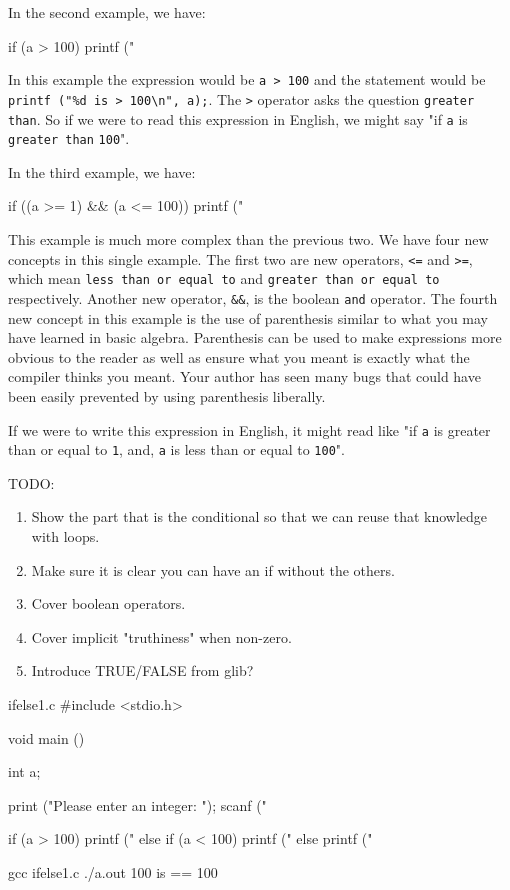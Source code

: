 In the second example, we have:

\begin{code}{}
if (a > 100) {
    printf ("%
}
\end{code}

In this example the expression would be \verb|a > 100| and the statement
would be \verb|printf ("%d is > 100\n", a);|. The \verb|>| operator asks
the question \verb|greater than|. So if we were to read this expression in
English, we might say "if \verb|a| is \verb|greater than| \verb|100|".

In the third example, we have:

\begin{code}{}
if ((a >= 1) && (a <= 100)) {
    printf ("%
}
\end{code}

This example is much more complex than the previous two.  We have four new
concepts in this single example. The first two are new operators, \verb|<=| and
\verb|>=|, which mean \verb|less than or equal to| and \verb|greater than or equal to|
respectively. Another new operator, \verb|&&|, is the boolean
\verb|and| operator. The fourth new concept in this example is the use of
parenthesis similar to what you may have learned in basic algebra.  Parenthesis
can be used to make expressions more obvious to the reader as well as ensure
what you meant is exactly what the compiler thinks you meant. Your author has
seen many bugs that could have been easily prevented by using parenthesis
liberally.

If we were to write this expression in English, it might read like "if \verb|a|
is greater than or equal to \verb|1|, and, \verb|a| is less than or equal to
\verb|100|".

TODO:

\begin{enumerate}
\item Show the part that is the conditional so that we can reuse that
      knowledge with loops.
\item Make sure it is clear you can have an if without the others.
\item Cover boolean operators.
\item Cover implicit "truthiness" when non-zero.
\item Introduce TRUE/FALSE from glib?
\end{enumerate}

\begin{code}{ifelse1.c}
#include <stdio.h>

void main ()
{
    int a;

    print ("Please enter an integer:  ");
    scanf ("%

    if (a > 100) {
        printf ("%
    } else if (a < 100) {
        printf ("%
    } else {
        printf ("%
    }
}
\end{code}

\begin{Terminal}
gcc ifelse1.c
./a.out
100 is == 100
\end{Terminal}
